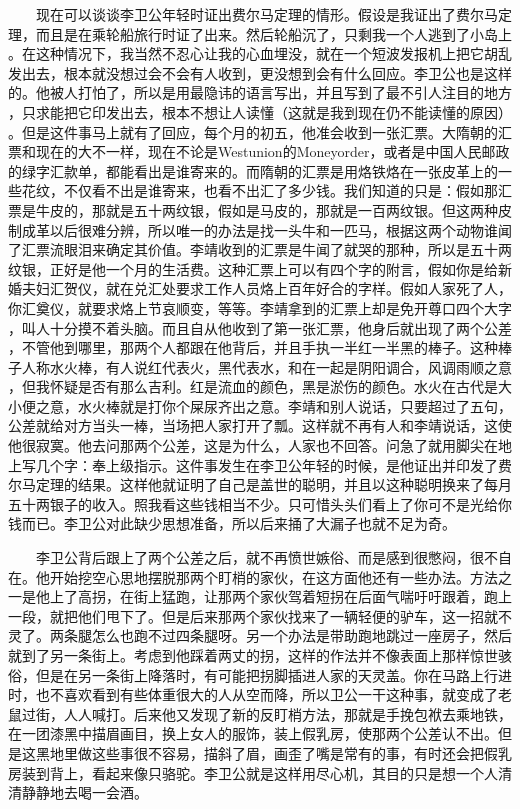  　　现在可以谈谈李卫公年轻时证出费尔马定理的情形。假设是我证出了费尔马定 理，而且是在乘轮船旅行时证了出来。然后轮船沉了，只剩我一个人逃到了小岛上 。在这种情况下，我当然不忍心让我的心血埋没，就在一个短波发报机上把它胡乱 发出去，根本就没想过会不会有人收到，更没想到会有什么回应。李卫公也是这样 的。他被人打怕了，所以是用最隐讳的语言写出，并且写到了最不引人注目的地方 ，只求能把它印发出去，根本不想让人读懂（这就是我到现在仍不能读懂的原因） 。但是这件事马上就有了回应，每个月的初五，他准会收到一张汇票。大隋朝的汇 票和现在的大不一样，现在不论是Westunion的Moneyorder，或者是中国人民邮政 的绿字汇款单，都能看出是谁寄来的。而隋朝的汇票是用烙铁烙在一张皮革上的一 些花纹，不仅看不出是谁寄来，也看不出汇了多少钱。我们知道的只是：假如那汇 票是牛皮的，那就是五十两纹银，假如是马皮的，那就是一百两纹银。但这两种皮 制成革以后很难分辨，所以唯一的办法是找一头牛和一匹马，根据这两个动物谁闻 了汇票流眼泪来确定其价值。李靖收到的汇票是牛闻了就哭的那种，所以是五十两 纹银，正好是他一个月的生活费。这种汇票上可以有四个字的附言，假如你是给新 婚夫妇汇贺仪，就在兑汇处要求工作人员烙上百年好合的字样。假如人家死了人， 你汇奠仪，就要求烙上节哀顺变，等等。李靖拿到的汇票上却是免开尊口四个大字 ，叫人十分摸不着头脑。而且自从他收到了第一张汇票，他身后就出现了两个公差 ，不管他到哪里，那两个人都跟在他背后，并且手执一半红一半黑的棒子。这种棒 子人称水火棒，有人说红代表火，黑代表水，和在一起是阴阳调合，风调雨顺之意 ，但我怀疑是否有那么吉利。红是流血的颜色，黑是淤伤的颜色。水火在古代是大 小便之意，水火棒就是打你个屎尿齐出之意。李靖和别人说话，只要超过了五句， 公差就给对方当头一棒，当场把人家打开了瓢。这样就不再有人和李靖说话，这使 他很寂寞。他去问那两个公差，这是为什么，人家也不回答。问急了就用脚尖在地 上写几个字：奉上级指示。这件事发生在李卫公年轻的时候，是他证出并印发了费 尔马定理的结果。这样他就证明了自己是盖世的聪明，并且以这种聪明换来了每月 五十两银子的收入。照我看这些钱相当不少。只可惜头头们看上了你可不是光给你 钱而已。李卫公对此缺少思想准备，所以后来捅了大漏子也就不足为奇。

 　　李卫公背后跟上了两个公差之后，就不再愤世嫉俗、而是感到很憋闷，很不自 在。他开始挖空心思地摆脱那两个盯梢的家伙，在这方面他还有一些办法。方法之 一是他上了高拐，在街上猛跑，让那两个家伙驾着短拐在后面气喘吁吁跟着，跑上 一段，就把他们甩下了。但是后来那两个家伙找来了一辆轻便的驴车，这一招就不 灵了。两条腿怎么也跑不过四条腿呀。另一个办法是带助跑地跳过一座房子，然后 就到了另一条街上。考虑到他踩着两丈的拐，这样的作法并不像表面上那样惊世骇 俗，但是在另一条街上降落时，有可能把拐脚插进人家的天灵盖。你在马路上行进 时，也不喜欢看到有些体重很大的人从空而降，所以卫公一干这种事，就变成了老 鼠过街，人人喊打。后来他又发现了新的反盯梢方法，那就是手挽包袱去乘地铁， 在一团漆黑中描眉画目，换上女人的服饰，装上假乳房，使那两个公差认不出。但 是这黑地里做这些事很不容易，描斜了眉，画歪了嘴是常有的事，有时还会把假乳 房装到背上，看起来像只骆驼。李卫公就是这样用尽心机，其目的只是想一个人清 清静静地去喝一会酒。 
 
